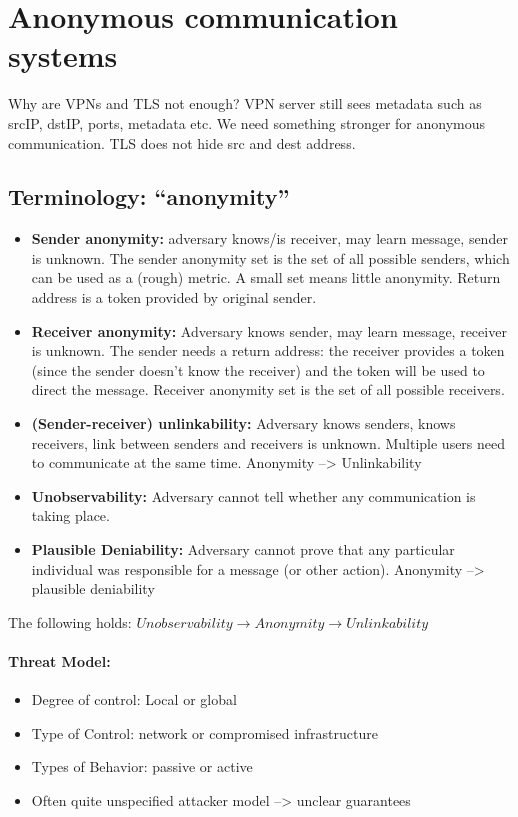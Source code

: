 \section{Anonymous communication systems}

Why are VPNs and TLS not enough? VPN server still sees metadata such as srcIP, dstIP, ports, metadata etc. We need something stronger for anonymous communication. TLS does not hide src and dest address.

\subsection{Terminology: “anonymity”}

\begin{itemize}
	\item \textbf{Sender anonymity:} adversary knows/is receiver, may learn message, sender is unknown. The sender anonymity set is the set of all possible senders, which can be used as a (rough) metric. A small set means little anonymity. Return address is a token provided by original sender.
	\item \textbf{Receiver anonymity:} Adversary knows sender, may learn message, receiver is unknown. The sender needs a return address: the receiver provides a token (since the sender doesn't know the receiver) and the token will be used to direct the message. Receiver anonymity set is the set of all possible receivers.
	\item \textbf{(Sender-receiver) unlinkability:} Adversary knows senders, knows receivers, link between senders and	receivers is unknown. Multiple users need to communicate at the same time. Anonymity --> Unlinkability
	\item \textbf{Unobservability:} Adversary cannot tell whether any communication is taking place.
	\item \textbf{Plausible Deniability:} Adversary cannot prove that any particular individual was responsible for a message (or other action). Anonymity --> plausible deniability
\end{itemize}

The following holds: $Unobservability \rightarrow Anonymity \rightarrow Unlinkability$

\paragraph{Threat Model: } 
\begin{itemize}
    \item Degree of control: Local or global
    \item Type of Control: network or compromised infrastructure
    \item Types of Behavior: passive or active
    \item Often quite unspecified attacker model --> unclear guarantees
\end{itemize}

